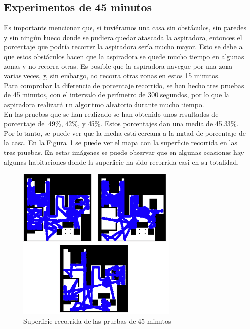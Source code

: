 \subsection{Experimentos de 45 minutos}
Es importante mencionar que, si tuviéramos una casa sin obstáculos, sin paredes y sin ningún hueco donde se pudiera quedar atascada la aspiradora, entonces el porcentaje que podría recorrer la aspiradora sería mucho mayor. Esto se debe a que estos obstáculos hacen que la aspiradora se quede mucho tiempo en algunas zonas y no recorra otras. Es posible que la aspiradora navegue por una zona varias veces, y, sin embargo, no recorra otras zonas en estos 15 minutos.\\

Para comprobar la diferencia de porcentaje recorrido, se han hecho tres pruebas de 45 minutos, con el intervalo de perímetro de 300 segundos, por lo que la aspiradora realizará un algoritmo aleatorio durante mucho tiempo. \\

En las pruebas que se han realizado se han obtenido unos resultados de porcentaje del 49\%, 42\%, y 45\%. Estos porcentajes dan una media de 45.33\%. Por lo tanto, se puede ver que la media está cercana a la mitad de porcentaje de la casa. En la Figura~\ref{fig.Referee_45MIN} se puede ver el mapa con la superficie recorrida en las tres pruebas. En estas imágenes se puede observar que en algunas ocasiones hay algunas habitaciones donde la superficie ha sido recorrida casi en su totalidad.\\

\begin{figure}[H]
  \begin{center}
    \includegraphics[width=0.7\textwidth]{figures/Vacuum/Referee_45MIN.png}
		\caption{Superficie recorrida de las pruebas de 45 minutos}
		\label{fig.Referee_45MIN}
		\end{center}
\end{figure}

